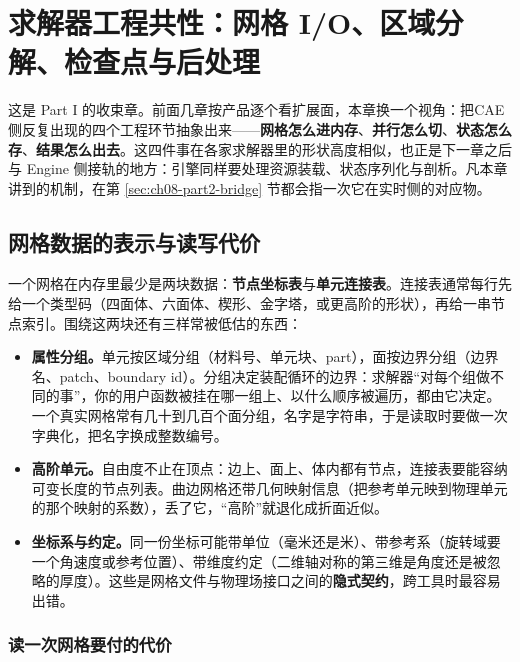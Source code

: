 \documentclass[12pt,a4paper,fontset=fandol]{ctexbook}
\newcommand{\Lang}[1]{\textsf{#1}}
\newcommand{\DomCAE}{\Lang{CAE}}
\newcommand{\DomEngine}{\Lang{Engine}}
\begin{document}
\chapter{求解器工程共性：网格 I/O、区域分解、检查点与后处理}
\label{ch:ch08-solver-engineering}

这是 Part I 的收束章。前面几章按产品逐个看扩展面，本章换一个视角：把\DomCAE{} 侧反复出现的四个工程环节抽象出来——\textbf{网格怎么进内存}、\textbf{并行怎么切}、\textbf{状态怎么存}、\textbf{结果怎么出去}。这四件事在各家求解器里的形状高度相似，也正是下一章之后与 \DomEngine{} 侧接轨的地方：引擎同样要处理资源装载、状态序列化与剖析。凡本章讲到的机制，在第 \ref{sec:ch08-part2-bridge} 节都会指一次它在实时侧的对应物。

\section{网格数据的表示与读写代价}
\label{sec:ch08-mesh-representation}

一个网格在内存里最少是两块数据：\textbf{节点坐标表}与\textbf{单元连接表}。连接表通常每行先给一个类型码（四面体、六面体、楔形、金字塔，或更高阶的形状），再给一串节点索引。围绕这两块还有三样常被低估的东西：

\begin{itemize}
\item \textbf{属性分组。}单元按区域分组（材料号、单元块、part），面按边界分组（边界名、patch、boundary id）。分组决定装配循环的边界：求解器``对每个组做不同的事''，你的用户函数被挂在哪一组上、以什么顺序被遍历，都由它决定。一个真实网格常有几十到几百个面分组，名字是字符串，于是读取时要做一次字典化，把名字换成整数编号。
\item \textbf{高阶单元。}自由度不止在顶点：边上、面上、体内都有节点，连接表要能容纳可变长度的节点列表。曲边网格还带几何映射信息（把参考单元映到物理单元的那个映射的系数），丢了它，``高阶''就退化成折面近似。
\item \textbf{坐标系与约定。}同一份坐标可能带单位（毫米还是米）、带参考系（旋转域要一个角速度或参考位置）、带维度约定（二维轴对称的第三维是角度还是被忽略的厚度）。这些是网格文件与物理场接口之间的\textbf{隐式契约}，跨工具时最容易出错。
\end{itemize}

\subsection*{读一次网格要付的代价}
\end{document}

